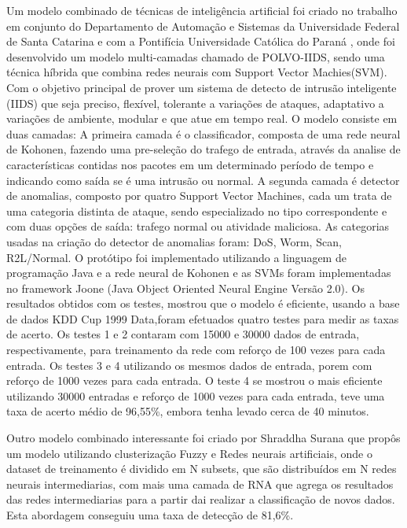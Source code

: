 Um modelo combinado de técnicas de inteligência artificial foi criado no trabalho em conjunto do Departamento de Automação e Sistemas da Universidade Federal de Santa Catarina \cite{polvo1} e com a Pontifícia Universidade Católica do Paraná \cite{polvo2}, onde foi desenvolvido um modelo multi-camadas chamado de POLVO-IIDS, sendo uma técnica híbrida que combina redes neurais com Support Vector Machies(SVM). Com o objetivo principal de prover um sistema de detecto de intrusão inteligente (IIDS) que seja preciso, flexível, tolerante a variações de ataques, adaptativo a variações de ambiente, modular e que atue em tempo real.
O modelo consiste em duas camadas: 
A primeira camada é o classificador, composta de uma rede neural de Kohonen, fazendo uma pre-seleção do trafego de entrada, através da analise de características contidas nos pacotes em um determinado período de tempo e indicando como saída se é uma intrusão ou normal.
A segunda camada é detector de anomalias, composto por quatro Support Vector Machines, cada um trata de uma categoria distinta de ataque, sendo especializado no tipo correspondente e com duas opções de saída: trafego normal ou atividade maliciosa. As categorias usadas na criação do detector de anomalias foram: DoS, Worm, Scan, R2L/Normal.
O protótipo foi implementado utilizando a linguagem de programação Java e a rede neural de Kohonen e as SVMs foram implementadas no framework Joone (Java Object Oriented Neural Engine Versão 2.0).
Os resultados obtidos com os testes, mostrou que o modelo é eficiente, usando a base de dados KDD Cup 1999 Data\cite{KDDCup99},foram efetuados quatro testes para medir as taxas de acerto. Os testes 1 e 2 contaram com 15000 e 30000 dados de entrada, respectivamente, para treinamento da rede com reforço de 100 vezes para cada entrada. Os testes 3 e 4 utilizando os mesmos dados de entrada, porem com reforço de 1000 vezes para cada entrada. O teste 4 se mostrou o mais eficiente utilizando 30000 entradas e reforço de 1000 vezes para cada entrada, teve uma taxa de acerto médio de 96,55\%, embora tenha levado cerca de 40 minutos.

Outro modelo combinado interessante foi criado por Shraddha Surana \cite{Surana} que propôs um modelo utilizando clusterização Fuzzy e Redes neurais artificiais, onde o dataset de treinamento é dividido em N subsets, que são distribuídos em N redes neurais intermediarias, com mais uma camada de RNA que agrega os resultados das redes intermediarias para a partir dai realizar a classificação de novos dados. Esta abordagem conseguiu uma taxa de detecção de 81,6\%.

